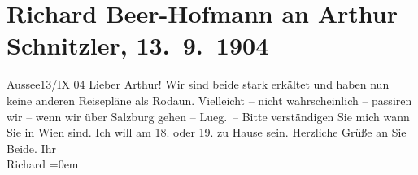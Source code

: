 

         
         \renewcommand{\erwaehntePersonen}{Personen: Paula Beer-Hofmann, Olga Schnitzler}
         \renewcommand{\erwaehnteOrte}{Orte: Bad Aussee, Lueg am Wolfgangsee, Rodaun, Salzburg, St. Gilgen, Wien}
         \renewcommand{\erwaehnteWerke}{}
               \section[Richard Beer-Hofmann an Arthur Schnitzler, 13. 9. 1904]{ Richard Beer-Hofmann an Arthur Schnitzler,
               13. 9. 1904}\nopagebreak{}\rehead{ }\begin{ledgroupsized}[t]{13cm}\normalsize\beginnumbering \toendnotes[C]{\smallbreak\pagebreak[2]} 
\toendnotes[C]{\smallbreak}\pstart
           \centering{}{\pb}Aussee13/IX 04\pend
           \pstart
           Lieber Arthur! Wir sind beide stark erkältet und haben nun keine anderen Reisepläne
               als Rodaun. Vielleicht – nicht wahrscheinlich –
               passiren wir – wenn wir über Salzburg gehen – Lueg. – Bitte verständigen Sie mich wann Sie in Wien sind. Ich will {\pb}am 18. oder
                  19. zu Hause sein.\pend
           \pstart
           Herzliche Grüße an Sie Beide.\pend
           \pstart
           Ihr{\\[\baselineskip]}\spacefill\mbox{Richard}\pend
           \leftskip=0em{}
         
         \endnumbering{}\end{ledgroupsized}  \newcommand{\dateiname}{L01443}\newcommand{\titel}{Richard Beer-Hofmann an Arthur Schnitzler, 13. 9. 1904}\newcommand{\editorInnen}{Martin Anton Müller und Gerd-Hermann Susen}
      